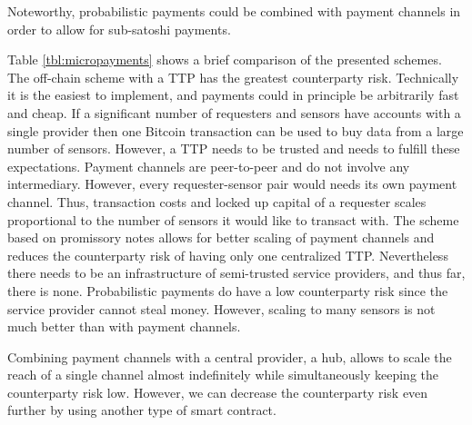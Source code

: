 Noteworthy, probabilistic payments could be combined with payment channels in order to allow for sub-satoshi payments.

\begin{table}
\caption{Comparison of Bitcoin micropayment schemes.}
\label{tbl:micropayments}
\end{table}

Table \ref{tbl:micropayments} shows a brief comparison of the presented schemes. The off-chain scheme with a \ac{TTP} has the greatest counterparty risk. Technically it is the easiest to implement, and payments could in principle be arbitrarily fast and cheap. If a significant number of requesters and sensors have accounts with a single provider then one Bitcoin transaction can be used to buy data from a large number of sensors. However, a \ac{TTP} needs to be trusted and needs to fulfill these expectations. Payment channels are peer-to-peer and do not involve any intermediary. However, every requester-sensor pair would needs its own payment channel. Thus, transaction costs and locked up capital of a requester scales proportional to the number of sensors it would like to transact with. The scheme based on promissory notes allows for better scaling of payment channels and reduces the counterparty risk of having only one centralized \ac{TTP}. Nevertheless there needs to be an infrastructure of semi-trusted service providers, and thus far, there is none. Probabilistic payments do have a low counterparty risk since the service provider cannot steal money. However, scaling to many sensors is not much better than with payment channels.

Combining payment channels with a central provider, a hub, allows to scale the reach of a single channel almost indefinitely while simultaneously keeping the counterparty risk low. However, we can decrease the counterparty risk even further by using another type of smart contract.

